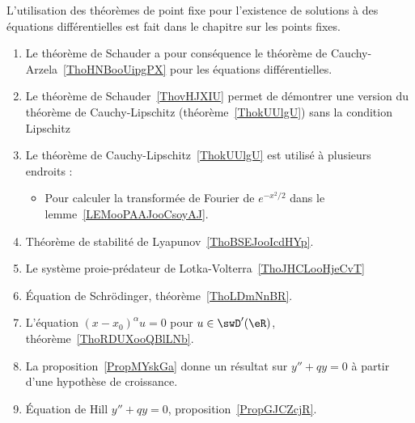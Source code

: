 
L'utilisation des théorèmes de point fixe pour l'existence de solutions à des équations différentielles est fait dans le chapitre sur les points fixes.
\begin{enumerate}
	\item
	      Le théorème de Schauder a pour conséquence le théorème de Cauchy-Arzela~\ref{ThoHNBooUipgPX} pour les équations différentielles.
	\item
	      Le théorème de Schauder~\ref{ThovHJXIU} permet de démontrer une version du théorème de Cauchy-Lipschitz (théorème~\ref{ThokUUlgU}) sans la condition Lipschitz
	\item
	      Le théorème de Cauchy-Lipschitz~\ref{ThokUUlgU} est utilisé à plusieurs endroits :
	      \begin{itemize}
		      \item
		            Pour calculer la transformée de Fourier de \(  e^{-x^2/2}\) dans le lemme~\ref{LEMooPAAJooCsoyAJ}.
	      \end{itemize}
	\item
	      Théorème de stabilité de Lyapunov~\ref{ThoBSEJooIcdHYp}.
	\item
	      Le système proie-prédateur de Lotka-Volterra~\ref{ThoJHCLooHjeCvT}
	\item
	      Équation de Schrödinger, théorème~\ref{ThoLDmNnBR}.
	\item
	      L'équation \( (x-x_0)^{\alpha}u=0\) pour \( u\in\swD'(\eR)\), théorème~\ref{ThoRDUXooQBlLNb}.
	\item
	      La proposition~\ref{PropMYskGa} donne un résultat sur \( y''+qy=0\) à partir d'une hypothèse de croissance.
	\item
	      Équation de Hill \( y''+qy=0\), proposition~\ref{PropGJCZcjR}.
\end{enumerate}
